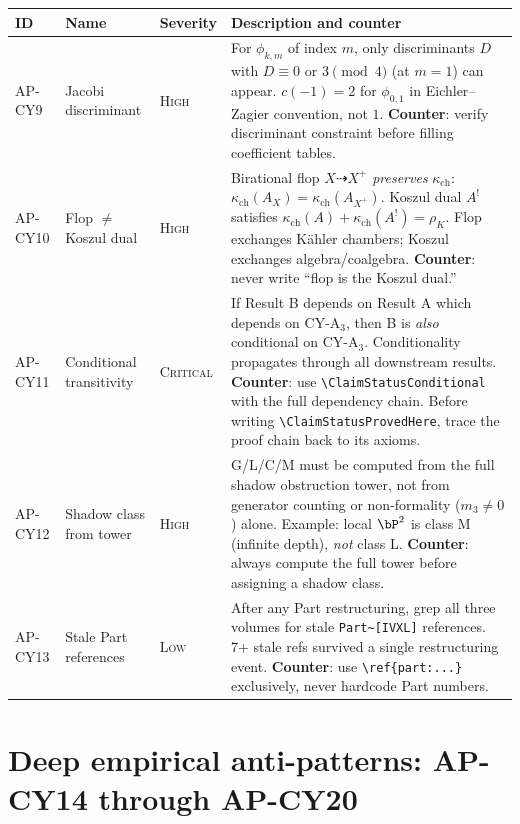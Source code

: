 {%
\small
\begin{longtable}{@{}p{1.6cm}p{2.4cm}lp{7.4cm}@{}}
\toprule
\textbf{ID} & \textbf{Name} & \textbf{Severity}
  & \textbf{Description and counter} \\
\midrule
\endhead
AP-CY9 & Jacobi discriminant & \textsc{High} &
  For $\phi_{k,m}$ of index $m$, only discriminants $D$ with
  $D \equiv 0$ or $3 \pmod{4}$ (at $m=1$) can appear.
  $c(-1) = 2$ for $\phi_{0,1}$ in Eichler--Zagier convention,
  not $1$.
  \textbf{Counter}: verify discriminant constraint before
  filling coefficient tables. \\
\midrule
AP-CY10 & Flop $\neq$ Koszul dual & \textsc{High} &
  Birational flop $X \dashrightarrow X^+$ \emph{preserves}
  $\kappa_{\mathrm{ch}}$: $\kappa_{\mathrm{ch}}(A_X) =
  \kappa_{\mathrm{ch}}(A_{X^+})$.  Koszul dual $A^!$
  satisfies $\kappa_{\mathrm{ch}}(A) +
  \kappa_{\mathrm{ch}}(A^!) = \rho_K$.  Flop exchanges
  K\"{a}hler chambers; Koszul exchanges algebra/coalgebra.
  \textbf{Counter}: never write ``flop is the Koszul dual.'' \\
\midrule
AP-CY11 & Conditional transitivity & \textsc{Critical} &
  If Result B depends on Result A which depends on CY-A$_3$,
  then B is \emph{also} conditional on CY-A$_3$.
  Conditionality propagates through all downstream results.
  \textbf{Counter}: use \verb|\ClaimStatusConditional| with
  the full dependency chain.  Before writing
  \verb|\ClaimStatusProvedHere|, trace the proof chain back
  to its axioms. \\
\midrule
AP-CY12 & Shadow class from tower & \textsc{High} &
  G/L/C/M must be computed from the full shadow obstruction
  tower, not from generator counting or non-formality
  ($m_3 \neq 0$) alone.  Example: local $\bP^2$ is class M
  (infinite depth), \emph{not} class L.
  \textbf{Counter}: always compute the full tower before
  assigning a shadow class. \\
\midrule
AP-CY13 & Stale Part references & \textsc{Low} &
  After any Part restructuring, grep all three volumes for
  stale \texttt{Part\textasciitilde{}[IVXL]} references.
  7+ stale refs survived a single restructuring event.
  \textbf{Counter}: use \verb|\ref{part:...}| exclusively,
  never hardcode Part numbers. \\
\bottomrule
\end{longtable}
}%

\section{Deep empirical anti-patterns: AP-CY14 through AP-CY20}
\label{sec:ap-cy14-20-full}

